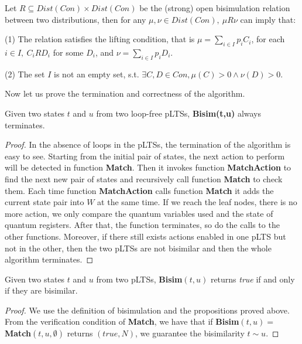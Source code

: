 \documentclass[a4paper,UKenglish,cleveref, autoref]{lipics-v2019}
\begin{document}
\begin{definition}

Let $\textit{R}\subseteq Dist(Con)\times Dist(Con)$ be the (strong) open bisimulation relation between two distributions, then for any $\mu,\nu\in Dist(Con),\ \mu\textit{R}\nu$ can imply that:
\begin{item}
\item[(1)] The relation satisfies the lifting condition, that is $\mu=\sum_{i\in I}p_i\textit{C}_i$, for each $i\in I,\ \textit{C}_i\textit{R}\textit{D}_i$ for some $\textit{D}_i$, and $\nu=\sum_{i\in I}p_i\textit{D}_i$.
\item[(2)] The set $I$ is not an empty set, s.t. $\exists C,D\in Con, \mu(C)>0\wedge\nu(D)>0$.
\end{item}
\end{definition}

Now let us prove the termination and correctness of the algorithm. 


\begin{theorem}[Termination]

Given two states $t$ and $u$ from two loop-free pLTSs, \textbf{Bisim(t,u)} always terminates.
\end{theorem} 
\begin{proof}
In the absence of loops in the pLTSs, the termination of the algorithm is easy to see.
Starting from the initial pair of states, the next action to perform will be detected in function \textbf{Match}. Then it invokes function \textbf{MatchAction} to find the next new pair of states and recursively call function \textbf{Match} to check them. Each time function \textbf{MatchAction} calls function \textbf{Match} it adds the current state pair into $W$ at the same time. If we reach the leaf nodes, there is no more action, we only compare the quantum variables used and the state of quantum registers. After that, the function terminates, so do the calls to the other functions. Moreover, if there still exists actions enabled in one pLTS but not in the other, then the two pLTSs are not bisimilar and then the whole algorithm terminates. 
\end{proof}

\begin{theorem}[Correctness]

Given two states $t$ and $u$ from two pLTSs, \textbf{Bisim}$(t,u)$ returns \textit{true} if and only if they are bisimilar.
\end{theorem} 
\begin{proof}
We use the definition of bisimulation and the propositions proved above. From the verification condition of \textbf{Match}, we have that if
\textbf{Bisim}$(t,u)=$\textbf{Match}$(t,u,\emptyset)$ 
returns $(true, N)$, we guarantee the bisimilarity $t\sim u$.
\end{proof}
\end{document}
